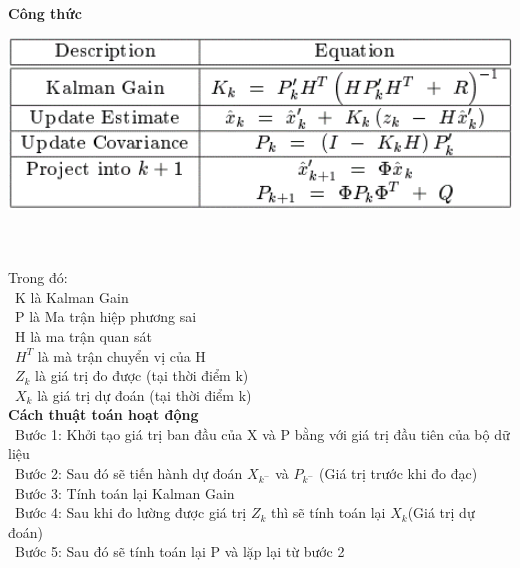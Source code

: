 \textbf{Công thức}\\
\begin{minipage}{0.45\textwidth}
\centering
\includegraphics[width=1\textwidth]{resources/chapter-4/kalman-fillter-1.png}
\end{minipage}
\\ \\
Trong đó:\\
    \indent\textbullet\ K là Kalman Gain\\
    \indent\textbullet\ P là Ma trận hiệp phương sai\\
    \indent\textbullet\ H là ma trận quan sát \\
    \indent\textbullet\ \(H^T\) là mà trận chuyển vị của H\\
    \indent\textbullet\ \(Z_k\) là giá trị đo được (tại thời điểm k)\\
    \indent\textbullet\ \(X_k\) là giá trị dự đoán (tại thời điểm k)\\
    

\textbf{Cách thuật toán hoạt động}\\
    \indent\textbullet\ Bước 1: Khởi tạo giá trị ban đầu của X và P bằng với giá trị đầu tiên của bộ dữ liệu\\
    \indent\textbullet\ Bước 2: Sau đó sẽ tiến hành dự đoán \(X_{k^-}\) và \(P_{k^-}\) (Giá trị trước khi đo đạc)\\
    \indent\textbullet\ Bước 3: Tính toán lại Kalman Gain\\
    \indent\textbullet\ Bước 4: Sau khi đo lường được giá trị \(Z_k\) thì sẽ tính toán lại \(X_k\)(Giá trị dự đoán)\\
    \indent\textbullet\ Bước 5: Sau đó sẽ tính toán lại P và lặp lại từ bước 2\\

